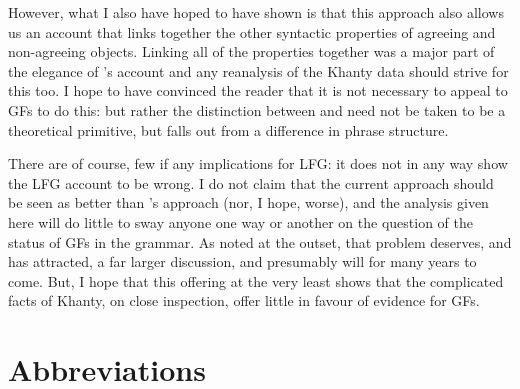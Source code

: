 \documentclass[output=paper
,modfonts
,nonflat]{langsci/langscibook}
\begin{document}
However, what I also have hoped to have shown is that this approach also allows us an account that links together the other syntactic properties of agreeing and non-agreeing objects.
Linking all of the properties together was a major part of the elegance of \citeauthor{dn2011}'s account and any reanalysis of the Khanty data should strive for this too.
I hope to have convinced the reader that it is not necessary to appeal to GFs to do this: but rather the distinction between \object {} and \robj {} need not be taken to be a theoretical primitive, but falls out from a difference in phrase structure.

There are of course, few if any implications for LFG: it does not in any way show the LFG account to be wrong. 
I do not claim that the current approach should be seen as better than \citeauthor{dn2011}'s approach (nor, I hope, worse), and the analysis given here will do little to sway anyone one way or another on the question of the status of GFs in the grammar.
As noted at the outset, that problem deserves, and has attracted, a far larger discussion, and presumably will for many years to come.
But, I hope that this offering at the very least shows that the complicated facts of Khanty, on close inspection, offer little in favour of evidence for GFs.

\section*{Abbreviations}
\end{document}
